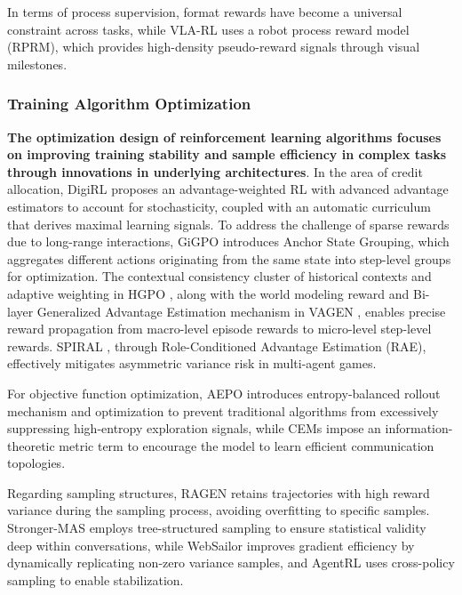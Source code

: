 \documentclass{llmxive}
\begin{document}
In terms of process supervision, format rewards have become a universal constraint across tasks, while VLA-RL \cite{VLA-RL} uses a robot process reward model (RPRM), which provides high-density pseudo-reward signals through visual milestones.

\subsubsection{Training Algorithm Optimization}
\label{sec:algorithmic_optimization}
\textbf{The optimization design of reinforcement learning algorithms focuses on improving training stability and sample efficiency in complex tasks through innovations in underlying architectures}.
In the area of credit allocation, DigiRL \cite{DigiRL} proposes an advantage-weighted RL with advanced advantage estimators to account for stochasticity, coupled with an automatic curriculum that derives maximal learning signals. To address the challenge of sparse rewards due to long-range interactions, GiGPO \cite{GiGPO} introduces Anchor State Grouping, which aggregates different actions originating from the same state into step-level groups for optimization. The contextual consistency cluster of historical contexts and adaptive weighting in HGPO \cite{HGPO}, along with the world modeling reward and Bi-layer Generalized Advantage Estimation mechanism in VAGEN \cite{VAGEN}, enables precise reward propagation from macro-level episode rewards to micro-level step-level rewards. SPIRAL \cite{SPIRAL}, through Role-Conditioned Advantage Estimation (RAE), effectively mitigates asymmetric variance risk in multi-agent games.


For objective function optimization, AEPO \cite{AEPO} introduces entropy-balanced rollout mechanism and optimization to prevent traditional algorithms from excessively suppressing high-entropy exploration signals, while CEMs \cite{CEMs} impose an information-theoretic metric term to encourage the model to learn efficient communication topologies.

Regarding sampling structures, RAGEN \cite{RAGEN} retains trajectories with high reward variance during the sampling process, avoiding overfitting to specific samples. Stronger-MAS \cite{STRONGER-MAS} employs tree-structured sampling to ensure statistical validity deep within conversations, while WebSailor \cite{WebSailor} improves gradient efficiency by dynamically replicating non-zero variance samples, and AgentRL \cite{AgentRL} uses cross-policy sampling to enable stabilization. 
\end{document}
